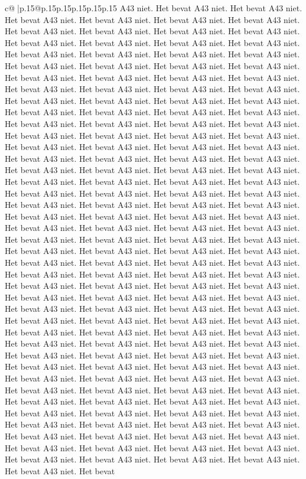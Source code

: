 \documentclass{article}
\begin{document}
{\begin{supertabular}{c@{$\;$}|p{.15\linewidth}@{}p{.15\linewidth}p{.15\linewidth}p{.15\linewidth}p{.15\linewidth}p{.15\linewidth}}
{{{A43 niet. Het bevat A43 niet. Het bevat A43 niet. Het bevat A43 niet. Het bevat A43 niet. Het bevat A43 niet. Het bevat A43 niet. Het bevat A43 niet. Het bevat A43 niet. Het bevat A43 niet. Het bevat A43 niet. Het bevat A43 niet. Het bevat A43 niet. Het bevat A43 niet. Het bevat A43 niet. Het bevat A43 niet. Het bevat A43 niet. Het bevat A43 niet. Het bevat A43 niet. Het bevat A43 niet. Het bevat A43 niet. Het bevat A43 niet. Het bevat A43 niet. Het bevat A43 niet. Het bevat A43 niet. Het bevat A43 niet. Het bevat A43 niet. Het bevat A43 niet. Het bevat A43 niet. Het bevat A43 niet. Het bevat A43 niet. Het bevat A43 niet. Het bevat A43 niet. Het bevat A43 niet. Het bevat A43 niet. Het bevat A43 niet. Het bevat A43 niet. Het bevat A43 niet. Het bevat A43 niet. Het bevat A43 niet. Het bevat A43 niet. Het bevat A43 niet. Het bevat A43 niet. Het bevat A43 niet. Het bevat A43 niet. Het bevat A43 niet. Het bevat A43 niet. Het bevat A43 niet. Het bevat A43 niet. Het bevat A43 niet. Het bevat A43 niet. Het bevat A43 niet. Het bevat A43 niet. Het bevat A43 niet. Het bevat A43 niet. Het bevat A43 niet. Het bevat A43 niet. Het bevat A43 niet. Het bevat A43 niet. Het bevat A43 niet. Het bevat A43 niet. Het bevat A43 niet. Het bevat A43 niet. Het bevat A43 niet. Het bevat A43 niet. Het bevat A43 niet. Het bevat A43 niet. Het bevat A43 niet. Het bevat A43 niet. Het bevat A43 niet. Het bevat A43 niet. Het bevat A43 niet. Het bevat A43 niet. Het bevat A43 niet. Het bevat A43 niet. Het bevat A43 niet. Het bevat A43 niet. Het bevat A43 niet. Het bevat A43 niet. Het bevat A43 niet. Het bevat A43 niet. Het bevat A43 niet. Het bevat A43 niet. Het bevat A43 niet. Het bevat A43 niet. Het bevat A43 niet. Het bevat A43 niet. Het bevat A43 niet. Het bevat A43 niet. Het bevat A43 niet. Het bevat A43 niet. Het bevat A43 niet. Het bevat A43 niet. Het bevat A43 niet. Het bevat A43 niet. Het bevat A43 niet. Het bevat A43 niet. Het bevat A43 niet. Het bevat A43 niet. Het bevat A43 niet. Het bevat A43 niet. Het bevat A43 niet. Het bevat A43 niet. Het bevat A43 niet. Het bevat A43 niet. Het bevat A43 niet. Het bevat A43 niet. Het bevat A43 niet. Het bevat A43 niet. Het bevat A43 niet. Het bevat A43 niet. Het bevat A43 niet. Het bevat A43 niet. Het bevat A43 niet. Het bevat A43 niet. Het bevat A43 niet. Het bevat A43 niet. Het bevat A43 niet. Het bevat A43 niet. Het bevat A43 niet. Het bevat A43 niet. Het bevat A43 niet. Het bevat A43 niet. Het bevat A43 niet. Het bevat A43 niet. Het bevat A43 niet. Het bevat A43 niet. Het bevat A43 niet. Het bevat A43 niet. Het bevat A43 niet. Het bevat A43 niet. Het bevat A43 niet. Het bevat A43 niet. Het bevat A43 niet. Het bevat A43 niet. Het bevat A43 niet. Het bevat A43 niet. Het bevat A43 niet. Het bevat A43 niet. Het bevat A43 niet. Het bevat A43 niet. Het bevat A43 niet. Het bevat A43 niet. Het bevat A43 niet. Het bevat A43 niet. Het bevat A43 niet. Het bevat A43 niet. Het bevat A43 niet. Het bevat A43 niet. Het bevat A43 niet. Het bevat A43 niet. Het bevat A43 niet. Het bevat A43 niet. Het bevat A43 niet. Het bevat A43 niet. Het bevat A43 niet. Het bevat A43 niet. Het bevat A43 niet. Het bevat A43 niet. Het bevat A43 niet. Het bevat }}}
\end{supertabular}}
\end{document}
